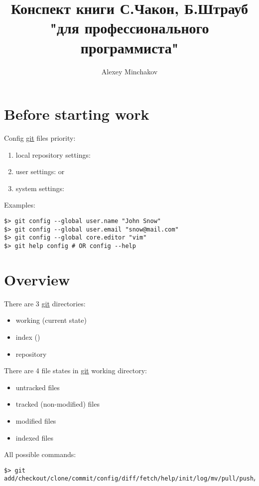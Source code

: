 \documentclass[a4paper, 12pt]{article}
\title{Конспект книги С.Чакон, Б.Штрауб "\git для профессионального программиста"}
\author{Alexey Minchakov}
\newcommand{\git}{\url{git}\xspace}
\begin{document}
\maketitle

\section{Before starting work}

Config \git files priority:

\begin{enumerate}
\item local repository settings: 
\item user settings:  or 
\item system settings: 
\end{enumerate}

Examples:
\begin{lstlisting}
$> git config --global user.name "John Snow"
$> git config --global user.email "snow@mail.com"
$> git config --global core.editor "vim"
$> git help config # OR config --help
\end{lstlisting}

\section{Overview}

There are 3 \git directories:
\begin{itemize}
\item working (current state)
\item index ()
\item repository
\end{itemize}

There are 4 file states in \git working directory:
\begin{itemize}
\item untracked files
\item tracked (non-modified) files
\item modified files
\item indexed files
\end{itemize}

All possible commands:
\begin{lstlisting}
$> git add/checkout/clone/commit/config/diff/fetch/help/init/log/mv/pull/push/reset/remote/rm/status/tag
\end{lstlisting}
\end{document}
